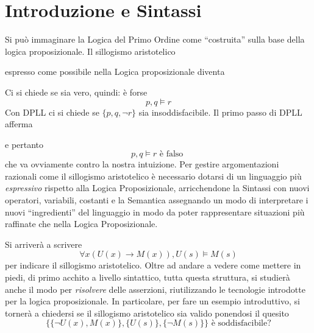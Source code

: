 
\chapter{Introduzione e Sintassi}
Si può immaginare la Logica del Primo Ordine come ``costruita'' 
sulla base della logica proposizionale. Il sillogismo aristotelico
\begin{prooftree}
\end{prooftree}
espresso come possibile nella Logica proposizionale diventa 
\begin{prooftree}
\end{prooftree}
Ci si chiede se sia vero, quindi: è forse 
$$
p, q \models r
$$
Con DPLL ci si chiede se 
$\{p, q, \neg r\}$ sia insoddisfacibile. 
Il primo passo di DPLL afferma
\begin{prooftree}
\end{prooftree}
e pertanto 
$$
p, q \models r \text{ è falso }
$$
che va ovviamente contro la nostra intuizione. 
Per gestire argomentazioni
razionali come il sillogismo aristotelico è necessario dotarsi di un linguaggio 
più \textit{espressivo} rispetto alla Logica Proposizionale, arricchendone 
la Sintassi con nuovi operatori, variabili, costanti e la Semantica assegnando 
un modo di interpretare i nuovi ``ingredienti'' del linguaggio in modo da poter 
rappresentare situazioni più raffinate che nella Logica Proposizionale. 

Si arriverà a scrivere 
$$
\forall x (U(x)\rightarrow M(x)), U(s) \models M(s)
$$
per indicare il sillogismo aristotelico.
Oltre ad andare a vedere come mettere in piedi, di primo acchito a livello sintattico, 
tutta questa struttura, si studierà anche il modo per \textit{risolvere} 
delle asserzioni, riutilizzando le tecnologie introdotte per la logica proposizionale.
In particolare, per fare un esempio introduttivo, si tornerà a chiedersi se 
il sillogismo aristotelico sia valido ponendosi  il quesito 
$$
\{\{\neg U(x), M(x)\}, \{U(s)\}, \{\neg M(s)\}\} \text{ è soddisfacibile?}
$$

